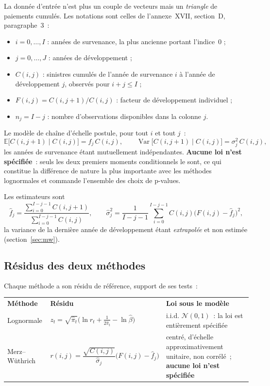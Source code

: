 \documentclass[a4paper,11pt]{article}
\begin{document}
La donnée d'entrée n'est plus un couple de vecteurs mais un \emph{triangle} de
paiements cumulés. Les notations sont celles de l'annexe~XVII, section~D,
paragraphe~3~:

\begin{itemize}[itemsep=1pt]
  \item $i = 0,\dots,I$ : années de survenance, la plus ancienne portant
        l'indice~0 ;
  \item $j = 0,\dots,J$ : années de développement ;
  \item $C(i,j)$ : sinistres cumulés de l'année de survenance $i$ à l'année de
        développement $j$, observés pour $i + j \le I$ ;
  \item $F(i,j) = C(i,j+1)/C(i,j)$ : facteur de développement individuel ;
  \item $n_j = I - j$ : nombre d'observations disponibles dans la colonne $j$.
\end{itemize}

\noindent
Le modèle de chaîne d'échelle postule, pour tout $i$ et tout $j$~:
\[
  \mathbb{E}\big[C(i,j+1)\mid C(i,j)\big] = f_j\,C(i,j),
  \qquad
  \operatorname{Var}\big[C(i,j+1)\mid C(i,j)\big] = \sigma_j^2\,C(i,j),
\]
les années de survenance étant mutuellement indépendantes. \textbf{Aucune loi
n'est spécifiée}~: seuls les deux premiers moments conditionnels le sont, ce qui
constitue la différence de nature la plus importante avec les méthodes
lognormales et commande l'ensemble des choix de p-values.

Les estimateurs sont
\[
  \hat f_j = \frac{\sum_{i=0}^{I-j-1} C(i,j+1)}{\sum_{i=0}^{I-j-1} C(i,j)},
  \qquad
  \hat\sigma_j^2 = \frac{1}{I-j-1}\sum_{i=0}^{I-j-1} C(i,j)
  \big(F(i,j) - \hat f_j\big)^2 ,
\]
la variance de la dernière année de développement étant \emph{extrapolée} et non
estimée (section~\ref{sec:mw}).

\subsection*{Résidus des deux méthodes}

Chaque méthode a son résidu de référence, support de ses tests~:

\begin{center}
\small
{}
\begin{tabular}{@{}p{3.0cm}p{5.6cm}p{6.3cm}@{}}
\rowcolor{tableheader}
\textcolor{financeblue}{\textbf{Méthode}} &
\textcolor{financeblue}{\textbf{Résidu}} &
\textcolor{financeblue}{\textbf{Loi sous le modèle}} \\
Lognormale & $z_t = \sqrt{\hat\pi_t}\big(\ln r_t + \tfrac{1}{2\hat\pi_t} - \ln\hat\beta\big)$ &
i.i.d. $\mathcal{N}(0,1)$~: la loi est entièrement spécifiée \\
Merz--Wüthrich & $r(i,j) = \dfrac{\sqrt{C(i,j)}}{\hat\sigma_j}\big(F(i,j) - \hat f_j\big)$ &
centré, d'échelle approximativement unitaire, non corrélé~; \textbf{aucune loi
n'est spécifiée} \\
\end{tabular}
\end{center}
\end{document}
